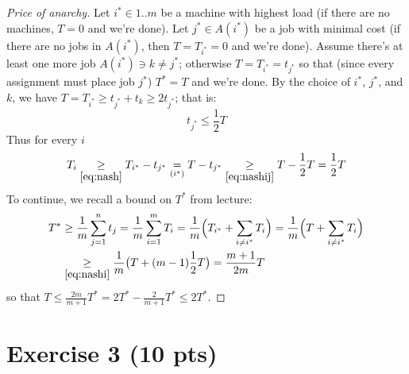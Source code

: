 \documentclass[a4paper]{article}
\begin{document}
\begin{proof}[Price of anarchy]
	Let $i^\ast \in 1..m$ be a machine with highest load (if there are no machines, $T = 0$ and we're done).
	Let $j^\ast \in A(i^\ast)$ be a job with minimal cost (if there are no jobs in $A(i^\ast)$, then $T = T_{i^\ast} = 0$ and we're done).
	Assume there's at least one more job $A(i^\ast) \ni k \not= j^\ast$; otherwise $T = T_{i^\ast} = t_{j^\ast}$ so that (since every assignment must place job $j^\ast$) $T^\ast = T$ and we're done.
	By the choice of $i^\ast$, $j^\ast$, and $k$, we have $T = T_{i^\ast} \ge t_{j^\ast} + t_k \ge 2t_{j^\ast}$; that is:
	\begin{equation}\label{eq:nashij}
		t_{j^\ast} \le \frac{1}{2}T
	\end{equation}
	Thus for every $i$
	\begin{equation}\label{eq:nashi}
		T_i \underset{\eqref{eq:nash}}{\ge} T_{i^\ast} - t_{j^\ast} \underset{(i^\ast)}{=} T - t_{j^\ast} \underset{\eqref{eq:nashij}}{\ge} T - \frac{1}{2}T = \frac{1}{2}T
	\end{equation}
	To continue, we recall a bound on $T^\ast$ from lecture:
	\begin{align*}
		T^\ast &\ge \frac{1}{m} \sum_{j=1}^n t_j = \frac{1}{m} \sum_{i=1}^m T_i = \frac{1}{m} \Bigl(T_{i^\ast} + \sum_{i \not= i^\ast} T_i\Bigr) = \frac{1}{m} \Bigl(T + \sum_{i \not= i^\ast} T_i\Bigr)\\
		&\underset{\eqref{eq:nashi}}{\ge} \frac{1}{m} \bigl(T + (m-1)\frac{1}{2} T\bigr) = \frac{m+1}{2m} T
	\end{align*}
	so that $T \le \frac{2m}{m+1} T^\ast = 2T^\ast - \frac{2}{m+1}T^\ast \le 2T^\ast$.
\end{proof}

\section*{Exercise 3 (10 pts)}
\end{document}
